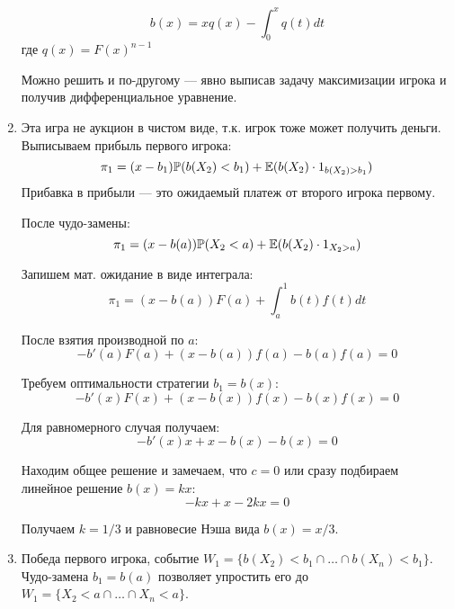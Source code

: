 \begin{enumerate}
\begin{equation}
\label{NE_all_pay}
b(x)=xq(x)-\int_{0}^{x}q(t)dt
\end{equation} 
где $ q(x)=F(x)^{n-1} $

Можно решить и по-другому --- явно выписав задачу максимизации игрока и получив дифференциальное уравнение.


\item Эта игра не аукцион в чистом виде, т.к. игрок тоже может получить деньги.
Выписываем прибыль первого игрока:
\begin{equation}
\pi_{1}=(x-b_{1})\mathbb{P}(b(X_{2})<b_{1})+\mathbb{E}(b(X_{2})\cdot 1_{b(X_{2})>b_{1}})
\end{equation}
Прибавка в прибыли --- это ожидаемый платеж от второго игрока первому.

После чудо-замены:
\begin{equation}
\pi_{1}=(x-b(a))\mathbb{P}(X_{2}<a)+\mathbb{E}(b(X_{2})\cdot 1_{X_{2}>a})
\end{equation}

Запишем мат. ожидание в виде интеграла:
\begin{equation}
\pi_{1}=(x-b(a))F(a)+\int_{a}^{1}b(t)f(t)dt
\end{equation}

После взятия производной по $ a $:
\begin{equation}
-b'(a)F(a)+(x-b(a))f(a)-b(a)f(a)=0
\end{equation}

Требуем оптимальности стратегии  $ b_{1}=b(x) $:
\begin{equation}
-b'(x)F(x)+(x-b(x))f(x)-b(x)f(x)=0
\end{equation}

Для равномерного случая получаем:
\begin{equation}
-b'(x)x+x-b(x)-b(x)=0
\end{equation}

Находим общее решение и замечаем, что $ c=0 $ или сразу подбираем линейное решение $ b(x)=kx $:
\begin{equation}
-kx+x-2kx=0
\end{equation}

Получаем $ k=1/3 $ и равновесие Нэша вида $ b(x)=x/3 $.



\item 

Победа первого игрока, событие $ W_{1}=\{b(X_{2})<b_{1}\cap \ldots\cap b(X_{n})<b_{1}\} $. Чудо-замена  $ b_{1}=b(a) $ позволяет упростить его до $ W_{1}=\{X_{2}<a\cap\ldots\cap X_{n}<a\} $.


\end{enumerate}
